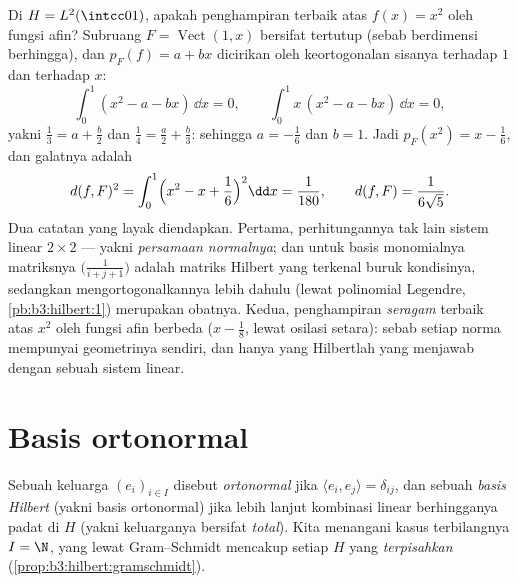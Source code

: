 \begin{example}
\label{ex:b3:hilbert:projectionexample}
Di $H = L^2(\intcc01)$, apakah penghampiran terbaik atas
$f(x) = x^2$ oleh fungsi afin? Subruang $F =
\operatorname{Vect}(1, x)$ bersifat tertutup (sebab berdimensi berhingga),
dan $p_F(f) = a + bx$ dicirikan oleh keortogonalan
sisanya terhadap $1$ dan terhadap $x$:
\[
\int_0^1(x^2 - a - bx)\,\dd x = 0,
\qquad
\int_0^1x\,(x^2 - a - bx)\,\dd x = 0,
\]
yakni $\frac13 = a + \frac b2$ dan $\frac14 = \frac a2 +
\frac b3$: sehingga $a = -\frac16$ dan $b = 1$. Jadi $p_F(x^2) = x -
\frac16$, dan galatnya adalah
\[
d(f, F)^2 = \int_0^1\Bigl(x^2 - x + \frac16\Bigr)^2\dd x =
\frac1{180},
\qquad d(f, F) = \frac1{6\sqrt5} .
\]
Dua catatan yang layak diendapkan. Pertama, perhitungannya
tak lain sistem linear $2\times2$ --- yakni \emph{persamaan
normalnya}; dan untuk basis monomialnya matriksnya
$\bigl(\frac1{i+j+1}\bigr)$ adalah matriks Hilbert yang
terkenal buruk kondisinya, sedangkan mengortogonalkannya lebih dahulu
(lewat polinomial Legendre, \cref{pb:b3:hilbert:1}) merupakan obatnya.
Kedua, penghampiran \emph{seragam} terbaik atas $x^2$ oleh
fungsi afin berbeda ($x - \frac18$, lewat
osilasi setara): sebab setiap norma mempunyai geometrinya sendiri, dan hanya
yang Hilbertlah yang menjawab dengan sebuah sistem linear.
\end{example}

\section{Basis ortonormal}

\begin{definition}\label{def:b3:hilbert:onb}
Sebuah keluarga $(e_i)_{i\in I}$ disebut \emph{ortonormal} jika $\langle
e_i, e_j\rangle = \delta_{ij}$, dan sebuah \emph{basis
Hilbert} (yakni basis ortonormal) jika lebih lanjut
kombinasi linear berhingganya padat di $H$ (yakni keluarganya
bersifat \emph{total}). Kita menangani kasus terbilangnya $I = \N$, yang lewat
Gram--Schmidt mencakup setiap $H$ yang \emph{terpisahkan}
(\cref{prop:b3:hilbert:gramschmidt}).
\end{definition}

